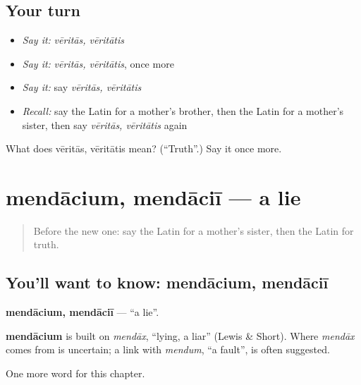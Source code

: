 \subsection*{Your turn}
\begin{itemize}
\raggedright
  \item \emph{Say it:} \emph{vēritās, vēritātis}
  \item \emph{Say it:} \emph{vēritās, vēritātis}, once more
  \item \emph{Say it:} say \emph{vēritās, vēritātis}
  \item \emph{Recall:} say the Latin for a mother's brother, then the Latin for a mother's sister, then say \emph{vēritās, vēritātis} again
\end{itemize}

\begin{tcolorbox}[breakable,colback=teal!4,colframe=teal!35!black,title={Before you move on}]
What does vēritās, vēritātis mean? (\textquotedblleft{}Truth\textquotedblright{}.) Say it once more.
\end{tcolorbox}
\section[mendācium, mendāciī]{mendācium, mendāciī — a lie}

\label{lesson:LA-C189-mendacium}



\begin{quote}
Before the new one: say the Latin for a mother's sister, then the Latin for truth.
\end{quote}

\subsection*{You'll want to know: mendācium, mendāciī}
\textbf{mendācium, mendāciī} — \textquotedblleft{}a lie\textquotedblright{}.

\begin{cousinweb}
\textbf{mendācium} is built on \emph{mendāx}, \textquotedblleft{}lying, a liar\textquotedblright{} (Lewis \& Short). Where \emph{mendāx} comes from is uncertain; a link with \emph{mendum}, \textquotedblleft{}a fault\textquotedblright{}, is often suggested.
\end{cousinweb}

\begin{grammarlens}[title={What you've built}]
One more word for this chapter.
\end{grammarlens}

